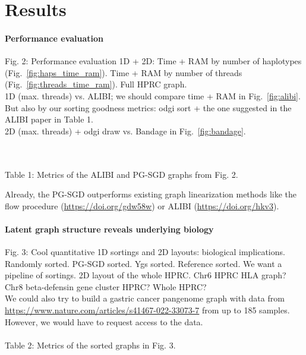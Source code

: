 \documentclass{bioinfo}
\theoremstyle{definition}
\begin{document}

\fi

\iffalse
\section{Results}
\label{sec:results}



\paragraph{Performance evaluation}
Fig. 2: Performance evaluation 1D + 2D: Time + RAM by number of haplotypes (Fig.~\ref{fig:haps_time_ram}). Time + RAM by number of threads (Fig.~\ref{fig:threads_time_ram}). Full HPRC graph.
\\
1D (max. threads) vs. ALIBI; we should compare time + RAM in Fig.~\ref{fig:alibi}.
But also by our sorting goodness metrics: odgi sort + the one suggested in the ALIBI paper in Table 1.
\\
2D (max. threads) + odgi draw vs. Bandage in Fig.~\ref{fig:bandage}.

\\
\\
Table 1: Metrics of the ALIBI and PG-SGD graphs from Fig. 2.

Already, the PG-SGD outperforms existing graph linearization methods like the flow procedure (\url{https://doi.org/gdw58w}) or ALIBI (\url{https://doi.org/hkv3}).
\paragraph{Latent graph structure reveals underlying biology}
Fig. 3: Cool quantitative 1D sortings and 2D layouts: biological implications.
Randomly sorted. PG-SGD sorted. Ygs sorted. Reference sorted.
We want a pipeline of sortings. 2D layout of the whole HPRC.
Chr6 HPRC HLA graph? Chr8 beta-defensin gene cluster HPRC? Whole HPRC?
\\
We could also try to build a gastric cancer pangenome graph with data from \url{https://www.nature.com/articles/s41467-022-33073-7} from up to 185 samples.
However, we would have to request access to the data.
\\
\\

Table 2: Metrics of the sorted graphs in Fig. 3.

\end{document}
